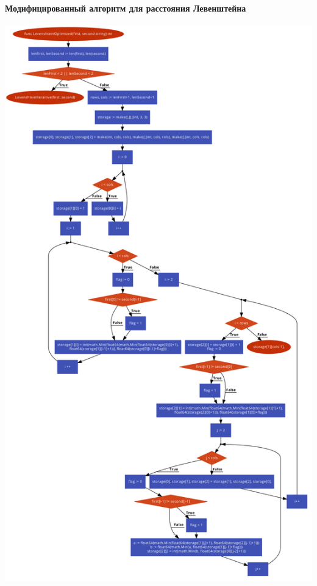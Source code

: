 \documentclass[utf8x, 12pt]{G7-32} %
\begin{document}
\paragraph{Модифицированный алгоритм для расстояния Левенштейна}
\begin{center}
	\includegraphics[scale=0.32]{images/levenshteinOptimized.png}
\end{center}

\newpage
\end{document}
